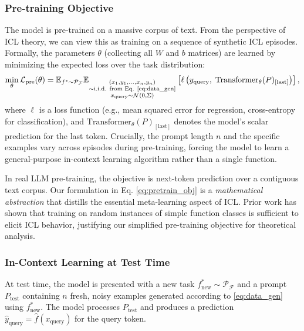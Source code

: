 \subsubsection{Pre-training Objective}
The model is pre-trained on a massive corpus of text. From the perspective of ICL theory, we can view this as training on a sequence of synthetic ICL episodes. Formally, the parameters \( \theta \) (collecting all \( W \) and \( b \) matrices) are learned by minimizing the expected loss over the task distribution:
\begin{equation}
	\min_{\theta} \mathcal{L}_{\text{pre}}(\theta) = \mathbb{E}_{f^* \sim \mathcal{P}_{\mathcal{F}}} \mathbb{E}_{\substack{(x_1, y_1, \dots, x_n, y_n) \\ \sim \text{i.i.d. from Eq. \ref{eq:data_gen}} \\ x_{\text{query}} \sim \mathcal{N}(0, \Sigma)}} \left[ \ell\left( y_{\text{query}}, \; \text{Transformer}_{\theta}(P)_{[\text{last}]} \right) \right],
	\label{eq:pretrain_obj}
\end{equation}
where \( \ell \) is a loss function (e.g., mean squared error for regression, cross-entropy for classification), and \( \text{Transformer}_{\theta}(P)_{[\text{last}]} \) denotes the model's scalar prediction for the last token. Crucially, the prompt length \( n \) and the specific examples vary across episodes during pre-training, forcing the model to learn a general-purpose in-context learning algorithm rather than a single function.

\begin{remark}
	In real LLM pre-training, the objective is next-token prediction over a contiguous text corpus. Our formulation in Eq. \ref{eq:pretrain_obj} is a \textit{mathematical abstraction} that distills the essential meta-learning aspect of ICL. Prior work \citep{chan2022data} has shown that training on random instances of simple function classes is sufficient to elicit ICL behavior, justifying our simplified pre-training objective for theoretical analysis.
\end{remark}

\subsubsection{In-Context Learning at Test Time}
At test time, the model is presented with a new task \( f^*_{\text{new}} \sim \mathcal{P}_{\mathcal{F}} \) and a prompt \( P_{\text{test}} \) containing \( n \) fresh, noisy examples generated according to \cref{eq:data_gen} using \( f^*_{\text{new}} \). The model processes \( P_{\text{test}} \) and produces a prediction \( \hat{y}_{\text{query}} = \hat{f}(x_{\text{query}}) \) for the query token.


